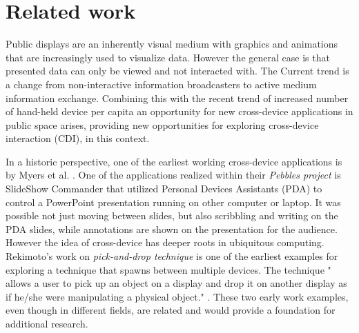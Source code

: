 \section{Related work} \label{sec:relatedwork}

Public displays are an inherently visual medium with graphics and animations that are increasingly used to visualize data. However the general case is that presented data can only be viewed and not interacted with. The Current trend is a change from non-interactive information broadcasters to active medium information exchange. Combining this with the recent trend of increased number of hand-held device per capita an opportunity for new cross-device applications in public space arises, providing new opportunities for exploring cross-device interaction (CDI), in this context.

In a historic perspective, one of the earliest working cross-device applications is by Myers et al. \cite{Myers:2001}. 
One of the applications realized within their \emph{Pebbles project} is SlideShow Commander that utilized Personal Devices Assistants (PDA) to control a PowerPoint presentation running on other computer or laptop.
It was possible not just moving between slides, but also scribbling and writing on the PDA slides, while annotations are shown on the presentation for the audience. 
However the idea of cross-device has deeper roots in ubiquitous computing. Rekimoto's work on \emph{pick-and-drop technique} is one of the earliest examples for exploring a technique that spawns between multiple devices. The technique " allows a user to pick up an object on a display and drop it on another display as if he/she were manipulating a physical object." \cite{Rekimoto:1997}. 
These two early work examples, even though in different fields, are related and would provide a foundation for additional research.\\

